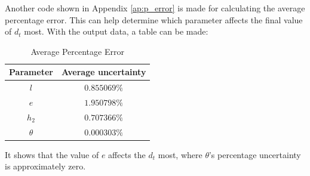 \documentclass{article}
\begin{document}
    Another code shown in Appendix \ref{ap:p_error} is made for calculating the average percentage error. This can help determine which parameter affects the final value of $d_t$ most. With the output data, a table can be made:
    
    \begin{table}[H]
        \caption {Average Percentage Error} \label{tb:a_p_e} 
        \begin{center}
            \begin{tabular}{cc}
                \hline
                Parameter & Average uncertainty \\
                \hline
                $l$         & $0.855069\%$     \\
                $e$         & $1.950798\%$     \\
                $h_2$       & $0.707366\%$     \\
                $\theta$    & $0.000303\%$     \\
                \hline
            \end{tabular}
        \end{center}
    \end{table}
    It shows that the value of $e$ affects the $d_t$ most, where $\theta$'s percentage uncertainty is approximately zero. 
\end{document}
